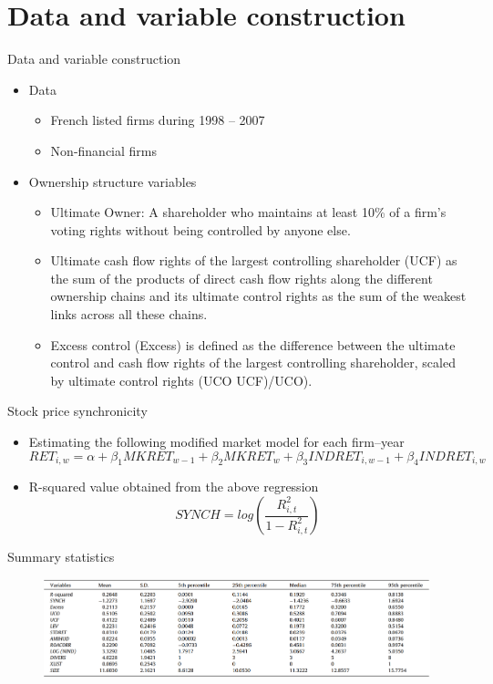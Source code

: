\documentclass{beamer}
\begin{document}
\section{Data and variable construction}
\begin{frame}{Data and variable construction}
\begin{itemize}
	\item Data
		\begin{itemize}
			\scriptsize
		\item French listed firms during 1998 –
		2007 
		\item Non-financial firms
		
	\end{itemize}
\item Ownership structure variables
\begin{itemize}
	\scriptsize
	\item Ultimate Owner: A shareholder who maintains at least 10\% of a firm’s voting rights without being controlled by anyone else.
	\item 
	Ultimate cash flow rights of the
	largest controlling shareholder (UCF) as the sum of the products of
	direct cash flow rights along the different ownership chains and its
	ultimate control rights as the sum of the weakest links across all these
	chains.
	\item  Excess control (Excess) is defined as the difference between the	ultimate control and cash flow rights of the largest controlling shareholder, scaled by ultimate control rights (UCO  UCF)/UCO).
\end{itemize}
\end{itemize}
\end{frame}
\begin{frame}{Stock price synchronicity}
\begin{itemize}
	\item  Estimating the following modified
	market model for each firm–year
	\begin{equation*}
		RET_{i,w} = \alpha + \beta_1 MKRET_{w-1}  + \beta_2 MKRET_{w}  + \beta_3 INDRET_{i,w-1}  + \beta_4 INDRET_{i,w}
	\end{equation*}
	\item  R-squared value obtained from the above regression
	\begin{equation*}
		SYNCH = log(\frac{R^2_{i,t}}{1-R^2_{i,t}})
	\end{equation*}
\end{itemize}
\end{frame}
\begin{frame}{Summary statistics}
	\begin{figure}
		\centering
		\includegraphics[width=\linewidth]{t2}
		\label{fig:t2}
	\end{figure}
	
\end{frame}
\end{document}
